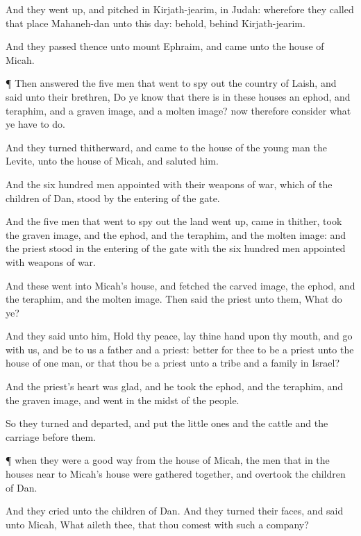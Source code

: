 {And they went
up, and
pitched in
Kirjath-jearim, in
Judah: wherefore they
called that
place
Mahaneh-dan unto this
day: behold,
{}
behind
Kirjath-jearim.

And they
passed thence unto
mount
Ephraim, and
came unto the
house of
Micah.


\par }{\PP {}¶ Then
answered the
five
men that
went to spy
out the
country of
Laish, and
said unto their
brethren, Do ye
know that there
is in these
houses an
ephod, and
teraphim, and a graven
image, and a molten
image? now therefore
consider what ye have to
do.

And they
turned thitherward, and
came to the
house of the young
man the
Levite,
{} unto the
house of
Micah, and
saluted him.

And the
six
hundred
men
appointed with their
weapons of
war, which
{} of the
children of
Dan,
stood by the
entering of the
gate.

And the
five
men that
went to spy
out the
land went
up,
{} came
in thither,
{}
took the graven
image, and the
ephod, and the
teraphim, and the molten
image: and the
priest
stood in the
entering of the
gate with the
six
hundred
men
{}
appointed with
weapons of
war.

And these
went into
Micah’s
house, and
fetched the carved
image, the
ephod, and the
teraphim, and the molten
image. Then
said the
priest unto them, What
do ye?

And they
said unto him, Hold thy
peace,
lay thine
hand upon thy
mouth, and
go with us, and be to
us a
father and a
priest:
{}
better for thee to be a
priest unto the
house of
one
man, or that thou be a
priest unto a
tribe and a
family in
Israel?

And the
priest’s
heart was
glad, and he
took the
ephod, and the
teraphim, and the graven
image, and went
in the
midst of the
people.

So they
turned and
departed, and
put the little
ones and the
cattle and the
carriage
before them.


\par }{\PP {}¶
{} when they were a good
way from the
house of
Micah, the
men that
{} in the
houses near to
Micah’s
house were gathered
together, and
overtook the
children of
Dan.

And they
cried unto the
children of
Dan. And they
turned their
faces, and
said unto
Micah, What aileth thee, that thou comest with such a
company?

}
